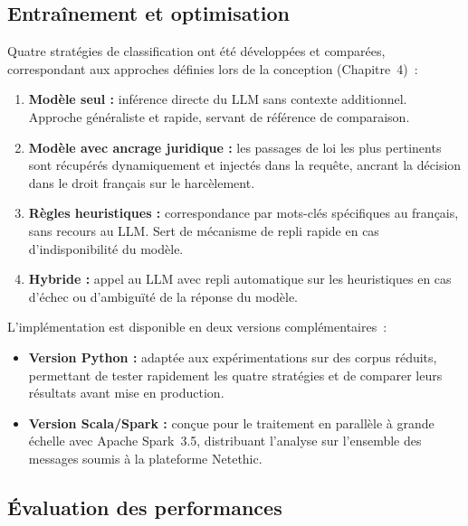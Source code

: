 \subsection{Entraînement et optimisation}

Quatre stratégies de classification ont été développées et comparées,
correspondant aux approches définies lors de la conception (Chapitre~4)~:

\begin{enumerate}
    \item \textbf{Modèle seul :} inférence directe du LLM sans contexte additionnel.
          Approche généraliste et rapide, servant de référence de comparaison.

    \item \textbf{Modèle avec ancrage juridique :} les passages de loi les plus
          pertinents sont récupérés dynamiquement et injectés dans la requête,
          ancrant la décision dans le droit français sur le harcèlement.

    \item \textbf{Règles heuristiques :} correspondance par mots-clés spécifiques
          au français, sans recours au LLM.
          Sert de mécanisme de repli rapide en cas d'indisponibilité du modèle.

    \item \textbf{Hybride :} appel au LLM avec repli automatique sur les heuristiques
          en cas d'échec ou d'ambiguïté de la réponse du modèle.
\end{enumerate}

L'implémentation est disponible en deux versions complémentaires~:
\begin{itemize}
    \item \textbf{Version Python :} adaptée aux expérimentations sur des corpus réduits,
          permettant de tester rapidement les quatre stratégies et de comparer
          leurs résultats avant mise en production.
    \item \textbf{Version Scala/Spark :} conçue pour le traitement en parallèle
          à grande échelle avec Apache Spark~3.5, distribuant l'analyse sur
          l'ensemble des messages soumis à la plateforme Netethic.
\end{itemize}

\subsection{Évaluation des performances}
\label{subsec:eval_classif}


